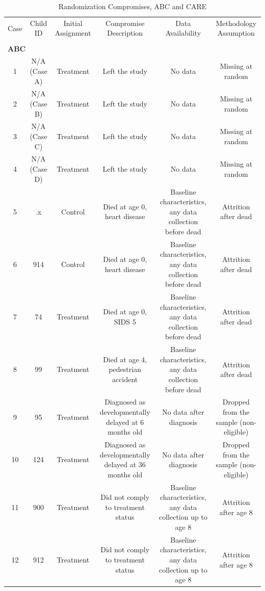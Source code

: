 
\begin{table} 
\begin{threeparttable}
\caption{Randomization Compromises, ABC and CARE}
\label{table:compromised}
\centering
\tiny
\begin{tabular}{cccccc} \hline \hline
Case & Child ID & Initial Assignment & Compromise Description & Data Availability & Methodology Assumption \\ \\ \hline
\multicolumn{6}{l}{\textbf{ABC}} \\ 
1 & N/A (Case A) & Treatment & Left the study & No data & Missing at random \\
2 & N/A (Case B) & Treatment & Left the study & No data & Missing at random \\
3 & N/A (Case C) & Treatment & Left the study & No data & Missing at random \\
4 & N/A (Case D)          & Treatment & Left the study & No data & Missing at random \\
5 & .x & Control            & Died at age 0, heart disease & Baseline characteristics, any data collection before dead      & Attrition after dead \\
6 & 914 & Control         & Died at age 0, heart disease & Baseline characteristics, any data collection before dead   & Attrition after dead \\
7 & 74 & Treatment      & Died at age 0, SIDS  5 & Baseline characteristics, any data collection before dead & Attrition after dead \\
8 & 99 & Treatment      & Died at age 4, pedestrian accident & Baseline characteristics, any data collection before dead & Attrition after dead \\
9 & 95   & Treatment       & Diagnosed as developmentally delayed at 6 months old   & No data after diagnosis & Dropped from the sample (non-eligible) \\ 
10 & 124 & Treatment       & Diagnosed as developmentally delayed at 36 months old & No data after diagnosis & Dropped from the sample (non-eligible) \\ 
11   & 900 & Treatment  & Did not comply to treatment status  & Baseline characteristics, any data collection up to age 8 & Attrition after age 8  \\
12 & 912 & Treatment  & Did not comply to treatment status  & Baseline characteristics, any data collection up to age 8 & Attrition after age 8 \\

\end{tabular}
\end{threeparttable}
\end{table}
